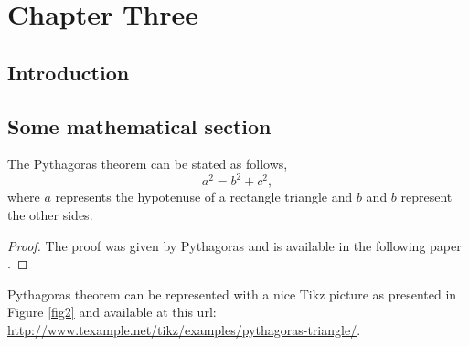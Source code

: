 \chapter{Chapter Three}
\label{Chap3}

\section{Introduction}

\blindtext[5]

\section{Some mathematical section}

\begin{theorem}
The Pythagoras theorem can be stated as follows,
\begin{equation}
a^{2} = b^2 + c^{2}, 
\end{equation}
where $a$ represents the hypotenuse of a rectangle triangle and $b$ and $b$ represent the other sides.
\end{theorem}

\begin{proof}
The proof was given by Pythagoras and is available in the following paper \citep{Veljan2000}.
\end{proof}

Pythagoras theorem can be represented with a nice Tikz picture as presented in Figure \ref{fig2} and available at this url: \\
\url{http://www.texample.net/tikz/examples/pythagoras-triangle/}.

